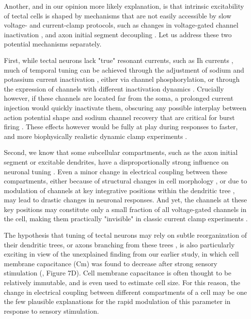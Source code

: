 \documentclass{article}
\begin{document}
Another, and in our opinion more likely explanation, is that intrinsic excitability of tectal cells is shaped by mechanisms that are not easily accessible by slow voltage- and current-clamp protocols, such as changes in voltage-gated channel inactivation \citep{azouz2000threshold}, and axon initial segment decoupling \citep{grubb2010activity, kuba2010initial, kole2012}. Let us address these two potential mechanisms separately.

First, while tectal neurons lack "true" resonant currents, such as Ih currents \citep{ciarleglio2015}, much of temporal tuning can be achieved through the adjustment of sodium and potassium current inactivation \citep{azouz2000threshold, fontaine2014threshold}, either via channel phosphorylation, or through the expression of channels with different inactivation dynamics \citep{frank2003nachannels, goldwyn2018a_current}. Crucially however, if these channels are located far from the soma, a prolonged current injection would quickly inactivate them, obscuring any possible interplay between action potential shape and sodium channel recovery that are critical for burst firing \citep{popovic2011, kole2012, fontaine2014threshold}. These effects however would be fully at play during responses to faster, and more biophysically realistic dynamic clamp experiments \citep{clay2012optimal, zbili2019axonnav}.

Second, we know that some subcellular compartments, such as the axon initial segment or excitable dendrites, have a disproportionally strong influence on neuronal tuning \citep{jarvis2018morphology, moldwin2019perceptron}. Even a minor change in electrical coupling between these compartments, either because of structural changes in cell morphology \citep{grubb2010activity, kuba2010initial, leterrier2018axon}, or due to modulation of channels at key integrative positions within the dendritic tree \citep{murakoshi1997kv2phosphorilation}, may lead to drastic changes in neuronal responses. And yet, the  channels at these key positions may constitute only a small fraction of all voltage-gated channels in the cell, making them practically "invisible" in classic current clamp experiments \citep{kole2007, hamada2016}. 

The hypothesis that tuning of tectal neurons may rely on subtle reorganization of their dendritic trees, or axons branching from these trees \citep{lazar1973golgi}, is also particularly exciting in view of the unexplained finding from our earlier study, in which cell membrane capacitance (Cm) was found to decrease after strong sensory stimulation (\citealt{ciarleglio2015}, Figure 7D). Cell membrane capacitance is often thought to be relatively immutable, and is even used to estimate cell size. For this reason, the change in electrical coupling between different compartments of a cell may be one the few plausible explanations for the rapid modulation of this parameter in response to sensory stimulation.
\end{document}
